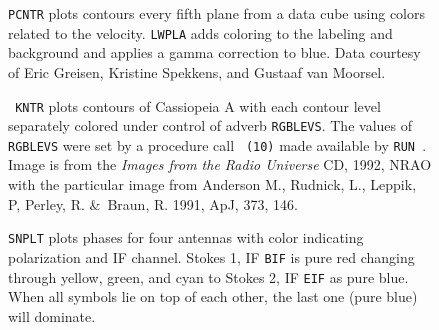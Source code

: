\begin{figure}
\centering
\centerline{}
\vspace{12pt}
\centerline{}
\caption[{\tt PCNTR} with contours colored by velocity]{{\tt PCNTR}
plots contours every fifth plane from a data cube using colors related
to the velocity.  {\tt LWPLA} adds coloring to the labeling and
background and applies a gamma correction to blue. Data courtesy of
Eric Greisen, Kristine Spekkens, and Gustaaf van Moorsel.}
\end{figure}

\begin{figure}
\centering
\centerline{}
\vspace{12pt}
\centerline{}
\caption[{\tt KNTR} with contours colored with {\tt RGBLEVS}]{{\tt
KNTR} plots contours of Cassiopeia A with each contour level
separately colored under control of adverb {\tt RGBLEVS}\@.  The
values of {\tt RGBLEVS} were set by a procedure call {\tt
{}(10)} made available by {\tt RUN }\@.
Image is from the {\it Images from the Radio Universe} CD, 1992, NRAO
with the particular image from Anderson M., Rudnick, L., Leppik, P,
Perley, R. \&\ Braun, R. 1991, ApJ, 373, 146.}
\end{figure}

\begin{figure}
\centering
\centerline{}
\vspace{12pt}
\centerline{}
\caption[{\tt SNPLT} with IFs/polarizations colored]{{\tt SNPLT} plots
phases for four antennas with color indicating polarization and IF
channel.  Stokes 1, IF {\tt BIF} is pure red changing through yellow,
green, and cyan to Stokes 2, IF {\tt EIF} as pure blue.  When all
symbols lie on top of each other, the last one (pure blue) will
dominate.}
\end{figure}
